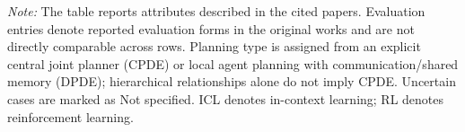 \begin{table}
{\begin{tabular}{rllllllllllll}
\bottomrule
\end{tabular}
}
\vspace{2pt}
\footnotesize{\emph{Note:} The table reports attributes described in the cited papers. Evaluation entries denote reported evaluation forms in the original works and are not directly comparable across rows. Planning type is assigned from an explicit central joint planner (CPDE) or local agent planning with communication/shared memory (DPDE); hierarchical relationships alone do not imply CPDE. Uncertain cases are marked as Not specified. ICL denotes in-context learning; RL denotes reinforcement learning.}
\end{table}
